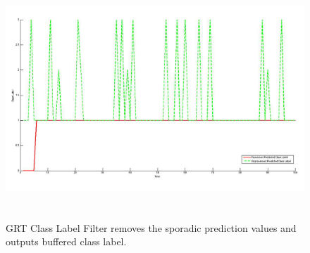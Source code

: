 \begin{figure}
	[h] \centering 
	\includegraphics[height=9cm]{figures/content/grt-label-filter.jpg} \caption{GRT Class Label Filter removes the sporadic prediction values and outputs buffered class label. \cite{16}} \label{fg:grt:label} 
\end{figure}
